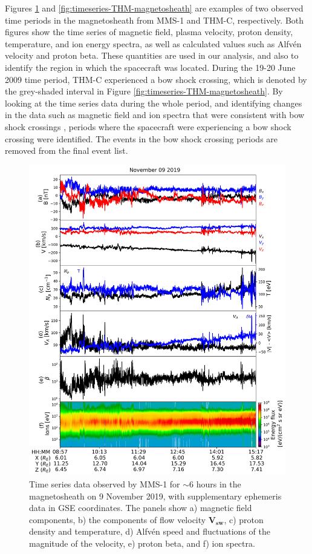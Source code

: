 Figures \ref{fig:timeseries-MMS-magnetosheath} and \ref{fig:timeseries-THM-magnetosheath} are examples of two observed time periods in the magnetosheath from MMS-1 and THM-C, respectively. Both figures show the time series of magnetic field, plasma velocity, proton density, temperature, and ion energy spectra, as well as calculated values such as Alfv\'en velocity and proton beta. These quantities are used in our analysis, and also to identify the region in which the spacecraft was located. During the 19-20 June 2009 time period, THM-C experienced a bow shock crossing, which is denoted by the grey-shaded interval in Figure \ref{fig:timeseries-THM-magnetosheath}. By looking at the time series data during the whole period, and identifying changes in the data such as magnetic field and ion spectra that were consistent with bow shock crossings \citep{Lalti:2022,Trotta:2022}, periods where the spacecraft were experiencing a bow shock crossing were identified. The events in the bow shock crossing periods are removed from the final event list.

\begin{figure}
    \centering
    \includegraphics[width=\textwidth]{Figures/Time series/timeseries_09112019_MMS1.png}
    \caption[Time series data observed in the magnetosheath on 9 November 2019]{Time series data observed by MMS-1 for $\sim$6 hours in the magnetosheath on 9 November 2019, with supplementary ephemeris data in GSE coordinates. The panels show a) magnetic field components, b) the components of flow velocity $\mathbf{V_{sw}}$, c) proton density and temperature, d) Alfv\'en speed and fluctuations of the magnitude of the velocity, e) proton beta, and f) ion spectra.}
    \label{fig:timeseries-MMS-magnetosheath}
\end{figure}

